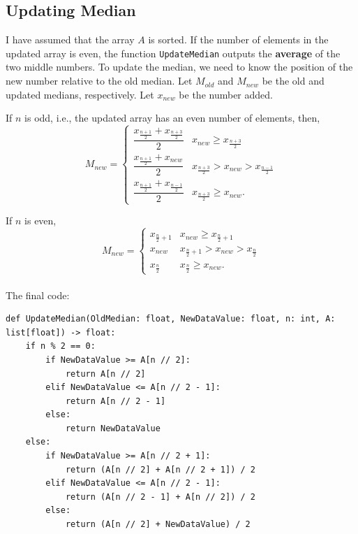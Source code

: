 \documentclass{article}
\begin{document}
\setcounter{equation}{0}
\subsection*{Updating Median}
I have assumed that the array $A$ is sorted. If the number of elements in the updated array is even, the function \texttt{UpdateMedian} outputs the \textbf{average} of the two middle numbers.
To update the median, we need to know the position of the new number relative to the old median. Let $M_{old}$ and $M_{new}$ be the old and updated medians, respectively. Let $x_{new}$ be the number added.

If $n$ is odd, i.e., the updated array has an even number of elements, then,
\begin{equation}
    M_{new}=\begin{cases}
        \dfrac{x_{\frac{n+1}{2}}+x_{\frac{n+3}{2}}}{2} & x_{new} \ge x_{\frac{n+3}{2}} \\
        \dfrac{x_{\frac{n+1}{2}}+x_{new}}{2} & x_{\frac{n+3}{2}} > x_{new} > x_{\frac{n-1}{2}} \\
        \dfrac{x_{\frac{n+1}{2}}+x_{\frac{n-1}{2}}}{2} & x_{\frac{n+3}{2}} \ge x_{new}.
    \end{cases}
\end{equation}

If $n$ is even,
\begin{equation}
    M_{new}=\begin{cases}
        x_{\frac{n}{2}+1} & x_{new} \ge x_{\frac{n}{2}+1} \\
        x_{new} & x_{\frac{n}{2}+1} > x_{new} > x_{\frac{n}{2}} \\
        x_{\frac{n}{2}} & x_{\frac{n}{2}} \ge x_{new}.
    \end{cases}
\end{equation}
\\[10pt]
The final code:
\begin{lstlisting}
def UpdateMedian(OldMedian: float, NewDataValue: float, n: int, A: list[float]) -> float:
    if n % 2 == 0:
        if NewDataValue >= A[n // 2]:
            return A[n // 2]
        elif NewDataValue <= A[n // 2 - 1]:
            return A[n // 2 - 1]
        else:
            return NewDataValue
    else:
        if NewDataValue >= A[n // 2 + 1]:
            return (A[n // 2] + A[n // 2 + 1]) / 2
        elif NewDataValue <= A[n // 2 - 1]:
            return (A[n // 2 - 1] + A[n // 2]) / 2
        else:
            return (A[n // 2] + NewDataValue) / 2
\end{lstlisting}
\end{document}
